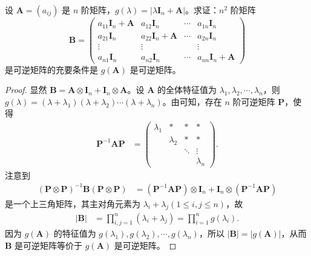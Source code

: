 \documentclass[../../main.tex]{subfiles}
\begin{document}
\begin{example}
设 $\boldsymbol{A} = (a_{ij})$ 是 $n$ 阶矩阵，$g(\lambda) = |\lambda\boldsymbol{I}_n + \boldsymbol{A}|$。求证：$n^2$ 阶矩阵
\[
\boldsymbol{B} = 
\begin{pmatrix}
a_{11}\boldsymbol{I}_n + \boldsymbol{A} & a_{12}\boldsymbol{I}_n & \cdots & a_{1n}\boldsymbol{I}_n \\
a_{21}\boldsymbol{I}_n & a_{22}\boldsymbol{I}_n + \boldsymbol{A} & \cdots & a_{2n}\boldsymbol{I}_n \\
\vdots & \vdots & & \vdots \\
a_{n1}\boldsymbol{I}_n & a_{n2}\boldsymbol{I}_n & \cdots & a_{nn}\boldsymbol{I}_n + \boldsymbol{A}
\end{pmatrix}
\]
是可逆矩阵的充要条件是 $g(\boldsymbol{A})$ 是可逆矩阵。
\end{example}
\begin{proof}
显然 $\boldsymbol{B} = \boldsymbol{A} \otimes \boldsymbol{I}_n + \boldsymbol{I}_n \otimes \boldsymbol{A}$。设 $\boldsymbol{A}$ 的全体特征值为 $\lambda_1, \lambda_2, \cdots, \lambda_n$，则 $g(\lambda) = (\lambda + \lambda_1)(\lambda + \lambda_2)\cdots(\lambda + \lambda_n)$。由可知，存在 $n$ 阶可逆矩阵 $\boldsymbol{P}$，使得
\begin{align*}
\boldsymbol{P}^{-1}\boldsymbol{AP} &= 
\begin{pmatrix}
\lambda_1 & * & * & * \\
 & \lambda_2 & * & * \\
 & & \ddots & \vdots \\
 & & & \lambda_n
\end{pmatrix}.
\end{align*}
注意到
\begin{align*}
(\boldsymbol{P} \otimes \boldsymbol{P})^{-1}\boldsymbol{B}(\boldsymbol{P} \otimes \boldsymbol{P}) &= (\boldsymbol{P}^{-1}\boldsymbol{AP}) \otimes \boldsymbol{I}_n + \boldsymbol{I}_n \otimes (\boldsymbol{P}^{-1}\boldsymbol{AP})
\end{align*}
是一个上三角矩阵，其主对角元素为 $\lambda_i + \lambda_j (1 \leq i, j \leq n)$，故
\begin{align*}
|\boldsymbol{B}| &= \prod_{i,j = 1}^{n} (\lambda_i + \lambda_j) = \prod_{i = 1}^{n} g(\lambda_i).
\end{align*}
因为 $g(\boldsymbol{A})$ 的特征值为 $g(\lambda_1), g(\lambda_2), \cdots, g(\lambda_n)$，所以 $|\boldsymbol{B}| = |g(\boldsymbol{A})|$，从而 $\boldsymbol{B}$ 是可逆矩阵等价于 $g(\boldsymbol{A})$ 是可逆矩阵。
\end{proof}
\end{document}
